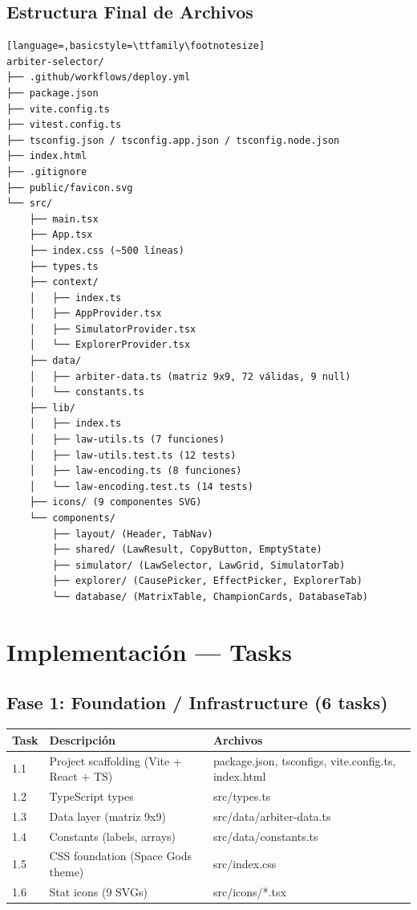 \documentclass[11pt,a4paper]{report}
\begin{document}
\section{Estructura Final de Archivos}

\begin{lstlisting}[language=,basicstyle=\ttfamily\footnotesize]
arbiter-selector/
├── .github/workflows/deploy.yml
├── package.json
├── vite.config.ts
├── vitest.config.ts
├── tsconfig.json / tsconfig.app.json / tsconfig.node.json
├── index.html
├── .gitignore
├── public/favicon.svg
└── src/
    ├── main.tsx
    ├── App.tsx
    ├── index.css (~500 líneas)
    ├── types.ts
    ├── context/
    │   ├── index.ts
    │   ├── AppProvider.tsx
    │   ├── SimulatorProvider.tsx
    │   └── ExplorerProvider.tsx
    ├── data/
    │   ├── arbiter-data.ts (matriz 9x9, 72 válidas, 9 null)
    │   └── constants.ts
    ├── lib/
    │   ├── index.ts
    │   ├── law-utils.ts (7 funciones)
    │   ├── law-utils.test.ts (12 tests)
    │   ├── law-encoding.ts (8 funciones)
    │   └── law-encoding.test.ts (14 tests)
    ├── icons/ (9 componentes SVG)
    └── components/
        ├── layout/ (Header, TabNav)
        ├── shared/ (LawResult, CopyButton, EmptyState)
        ├── simulator/ (LawSelector, LawGrid, SimulatorTab)
        ├── explorer/ (CausePicker, EffectPicker, ExplorerTab)
        └── database/ (MatrixTable, ChampionCards, DatabaseTab)
\end{lstlisting}

\cleardoublepage

\chapter{Implementación — Tasks}

\section{Fase 1: Foundation / Infrastructure (6 tasks)}

\begin{table}[h]
\centering
\small
\begin{tabular}{@{}lll@{}}
\toprule
\textbf{Task} & \textbf{Descripción} & \textbf{Archivos} \\
\midrule
1.1 & Project scaffolding (Vite + React + TS) & package.json, tsconfigs, vite.config.ts, index.html \\
1.2 & TypeScript types & src/types.ts \\
1.3 & Data layer (matriz 9x9) & src/data/arbiter-data.ts \\
1.4 & Constants (labels, arrays) & src/data/constants.ts \\
1.5 & CSS foundation (Space Gods theme) & src/index.css \\
1.6 & Stat icons (9 SVGs) & src/icons/*.tsx \\
\bottomrule
\end{tabular}
\end{table}
\end{document}

